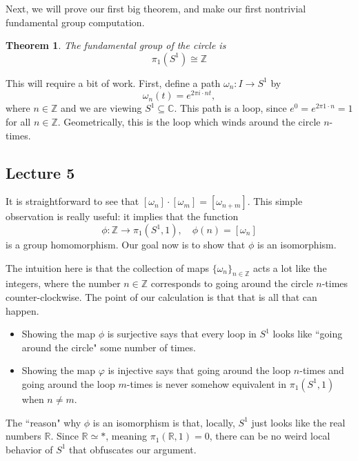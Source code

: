 \documentclass[10pt]{amsart}
\newtheorem{thm}{Theorem}[section]
\theoremstyle{definition}
\begin{document}
Next, we will prove our first big theorem, and make our first nontrivial fundamental group computation.

\begin{thm}
    The fundamental group of the circle is 
    \[
    \pi_1(S^1) \cong \mathbb{Z}
    \]
\end{thm}

This will require a bit of work. First, define a path $\omega_n:I \to S^1$ by
\[
\omega_n(t) = e^{2\pi i\cdot n t},
\]
where $n \in \mathbb{Z}$ and we are viewing $S^1 \subseteq \mathbb{C}$. 
This path is a loop, since $e^{0} = e^{2\pi 1 \cdot n} = 1$ for all $n \in \mathbb{Z}$. 
Geometrically, this is the loop which winds around the circle $n$-times. 

\subsection*{Lecture 5}
\hfill

It is straightforward to see that $[\omega_n] \cdot [\omega_m] = [\omega_{n+m}]$. 
This simple observation is really useful: it implies that the function
\[
\phi:\mathbb{Z} \to \pi_1(S^1, 1), \quad \phi(n) = [\omega_n]
\]
is a group homomorphism. Our goal now is to show that $\phi$ is an isomorphism.

The intuition here is that the collection of maps $\{\omega_n\}_{n \in \mathbb{Z}}$ acts a lot like the integers, where the number $n \in  \mathbb{Z}$ corresponds to going around the circle $n$-times counter-clockwise. The point of our calculation is that that is all that can happen.
\begin{itemize}
    \item Showing the map $\phi$ is surjective says that every loop in $S^1$ looks like ``going around the circle" some number of times.
    \item Showing the map $\varphi$ is injective says that going around the loop $n$-times and going around the loop $m$-times is never somehow equivalent in $\pi_1(S^1, 1)$ when $n \neq m$.
\end{itemize}
The ``reason" why $\phi$ is an isomorphism is that, locally, $S^1$ just looks like the real numbers $\mathbb{R}$. Since $\mathbb{R} \simeq *$, meaning $\pi_1(\mathbb{R}, 1) = 0$, there can be no weird local behavior of $S^1$ that obfuscates our argument.
\end{document}
